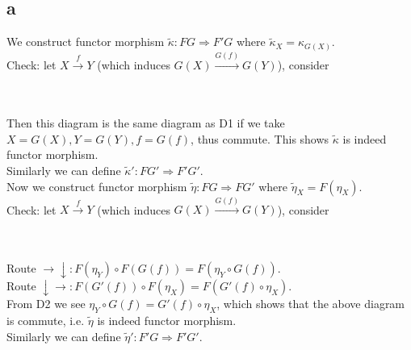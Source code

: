 \documentclass{article}
\begin{document}

\subsection{a}

We construct functor morphism $\widetilde{\kappa}:FG\Rightarrow F'G$ where $\widetilde{\kappa}_X=\kappa_{G(X)}$.\\
Check: let $X\xrightarrow{f} Y$ (which induces $G(X)\xrightarrow{G(f)}G(Y)$), consider\\

\\ \\
Then this diagram is the same diagram as D1 if we take $X=G(X),Y=G(Y),f=G(f)$, thus commute. This shows $\widetilde{\kappa}$ is indeed functor morphism.\\
Similarly we can define $\widetilde{\kappa}':FG'\Rightarrow F'G'$.\\
Now we construct functor morphism $\widetilde{\eta}:FG\Rightarrow FG'$ where $\widetilde{\eta}_X=F(\eta_X)$.\\
Check: let $X\xrightarrow{f} Y$ (which induces $G(X)\xrightarrow{G(f)}G(Y)$), consider\\

\\ \\
Route $\rightarrow\downarrow:F(\eta_Y)\circ F(G(f))=F(\eta_Y\circ G(f))$.\\
Route $\downarrow\rightarrow:F(G'(f))\circ F(\eta_X)=F(G'(f)\circ \eta_X)$.\\
From D2 we see $\eta_Y\circ G(f)=G'(f)\circ \eta_X$, which shows that the above diagram is commute, i.e. $\widetilde{\eta}$ is indeed functor morphism.\\
Similarly we can define $\widetilde{\eta}':F'G\Rightarrow F'G'.$
\end{document}
